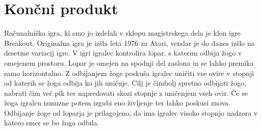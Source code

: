 \documentclass[12pt,a4paper,twoside]{book}
\begin{document}
\section{Končni produkt}
Računalniška igra, ki smo jo izdelali v sklopu magistrskega dela je klon igre Breakout. Originalna igra je izšla leta 1976 za Atari, vendar je do danes izšlo na desetine variacij igre. V igri igralec kontrolira lopar, s katerim odbija žogo v omejenem prostoru. Lopar je omejen na spodnji del zaslona in se lahko premika samo horizontalno. Z odbijanjem žoge poskuša igralec uničiti vse ovire v stopnji od katerih se žoga odbija ko jih uničuje. Cilj je čimbolj spretno odbijati žogo, nabrati čim več pik ter napredovati skozi stopnje z uničenjem vseh ovir. Če se žoga igralcu izmuzne potem izgubi eno življenje ter lahko poskusi znova. Odbijanje žoge od loparja je prilagojeno, da ima igralec visoko stopnjo nadzora v katero smer se bo žoga odbila.
\end{document}
